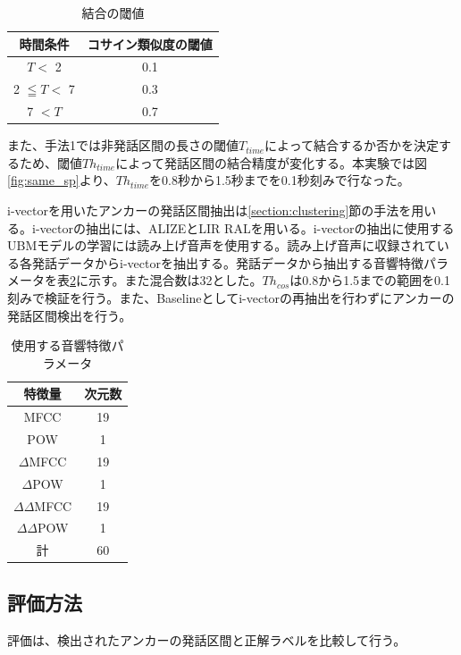 \begin{table}[H]
  \begin{center}
    \caption{結合の閾値 \label{table:decide_thcos}}
    \begin{tabular}{|c||c|} \hline
時間条件 & コサイン類似度の閾値  \\ \hline
$T <$ 2 &  0.1 \\ \hline
2 $\leqq T <$ 7 &  0.3  \\ \hline
7 $< T$ &  0.7 \\ \hline
    \end{tabular}
  \end{center}
\end{table}

また、手法1では非発話区間の長さの閾値$T_{time}$によって結合するか否かを決定するため、閾値$Th_{time}$によって発話区間の結合精度が変化する。本実験では図\ref{fig:same_sp}より、$Th_{time}$を0.8秒から1.5秒までを0.1秒刻みで行なった。

i-vectorを用いたアンカーの発話区間抽出は\ref{section:clustering}節の手法を用いる。i-vectorの抽出には、ALIZEとLIR RALを用いる。i-vectorの抽出に使用するUBMモデルの学習には読み上げ音声\cite{ATR}を使用する。読み上げ音声に収録されている各発話データからi-vectorを抽出する。発話データから抽出する音響特徴パラメータを表\ref{iv_feature2}に示す。また混合数は32とした。$Th_{cos}$は0.8から1.5までの範囲を0.1刻みで検証を行う。また、Baselineとしてi-vectorの再抽出を行わずにアンカーの発話区間検出を行う。\par

\begin{table}[H]
  \begin{center}
    \caption{使用する音響特徴パラメータ \label{iv_feature2}}
    \begin{tabular}{|c||c|} \hline
      特徴量 & 次元数\\ \hline
      MFCC & 19  \\ 
      POW & 1  \\ 
      $\Delta$MFCC & 19 \\ 
      $\Delta$POW & 1 \\ 
      $\Delta\Delta$MFCC & 19 \\ 
      $\Delta\Delta$POW & 1 \\ \hline
      計 & 60 \\ \hline
    \end{tabular}
  \end{center}
\end{table}

\subsection{評価方法}
評価は、検出されたアンカーの発話区間と正解ラベルを比較して行う。

